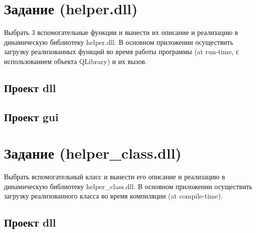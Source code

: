 
\section{Задание (helper.dll)}

Выбрать 3 вспомогательные функции и вынести их описание и реализацию в динамическую библиотеку helper.dll.
В основном приложении осуществить загрузку реализованных функций во время работы программы
(at run-time, с использованием объекта QLibrary) и их вызов.

\subsection{Проект dll}









\subsection{Проект gui}




\newpage

\section{Задание (helper\_class.dll)}

Выбрать вспомогательный класс и вынести его описание и реализацию в динамическую библиотеку helper\_class.dll.
В основном приложении осуществить загрузку реализованного класса во время компиляции (at compile-time).

\subsection{Проект dll}



